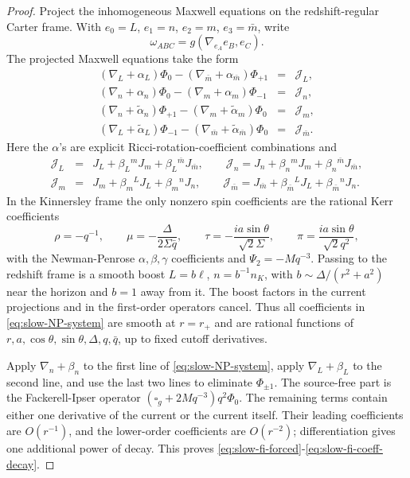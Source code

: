 \documentclass[11pt]{article}
\numberwithin{equation}{section}
\theoremstyle{plain}
\theoremstyle{definition}
\theoremstyle{remark}
\begin{document}
\begin{proof}
Project the inhomogeneous Maxwell equations on the redshift-regular Carter frame.  With \(e_0=L\), \(e_1=n\), \(e_2=m\), \(e_3=\bar m\), write
\begin{equation}
 \omega_{ABC}=g(\nabla_{e_A}e_B,e_C).
\end{equation}
The projected Maxwell equations take the form
\begin{eqnarray}\label{eq:slow-NP-system}
(\nabla_L+\alpha_L)\Phi_0-(\nabla_{\bar m}+\alpha_{\bar m})\Phi_{+1}
&=&\mathcal J_L,
\nonumber\\
(\nabla_n+\alpha_n)\Phi_0-(\nabla_m+\alpha_m)\Phi_{-1}
&=&\mathcal J_n,
\nonumber\\
(\nabla_n+\widetilde\alpha_n)\Phi_{+1}-(\nabla_m+\widetilde\alpha_m)\Phi_0
&=&\mathcal J_m,
\nonumber\\
(\nabla_L+\widetilde\alpha_L)\Phi_{-1}-(\nabla_{\bar m}+\widetilde\alpha_{\bar m})\Phi_0
&=&\mathcal J_{\bar m}.
\end{eqnarray}
Here the \(\alpha\)'s are explicit Ricci-rotation-coefficient combinations and
\begin{eqnarray}
\mathcal J_L&=&J_L+\beta_L{}^mJ_m+\beta_L{}^{\bar m}J_{\bar m},
\qquad
\mathcal J_n=J_n+\beta_n{}^mJ_m+\beta_n{}^{\bar m}J_{\bar m},
\nonumber\\
\mathcal J_m&=&J_m+\beta_m{}^LJ_L+\beta_m{}^nJ_n,
\qquad
\mathcal J_{\bar m}=J_{\bar m}+\beta_{\bar m}{}^LJ_L+\beta_{\bar m}{}^nJ_n.
\end{eqnarray}
In the Kinnersley frame the only nonzero spin coefficients are the rational Kerr coefficients
\begin{equation}
 \rho=-q^{-1},
 \qquad
 \mu=-\frac{\Delta}{2\Sigma\bar q},
 \qquad
 \tau=-\frac{ia\sin\theta}{\sqrt2\Sigma},
 \qquad
 \pi=\frac{ia\sin\theta}{\sqrt2 q^2},
\end{equation}
with the Newman-Penrose \(\alpha,\beta,\gamma\) coefficients and \(\Psi_2=-Mq^{-3}\).  Passing to the redshift frame is a smooth boost \(L=b\ell\), \(n=b^{-1}n_K\), with \(b\sim\Delta/(r^2+a^2)\) near the horizon and \(b=1\) away from it.  The boost factors in the current projections and in the first-order operators cancel.  Thus all coefficients in \eqref{eq:slow-NP-system} are smooth at \(r=r_+\) and are rational functions of \(r,a,\cos\theta,\sin\theta,\Delta,q,\bar q\), up to fixed cutoff derivatives.

Apply \(\nabla_n+\beta_n\) to the first line of \eqref{eq:slow-NP-system}, apply \(\nabla_L+\beta_L\) to the second line, and use the last two lines to eliminate \(\Phi_{\pm1}\).  The source-free part is the Fackerell-Ipser operator \((\square_g+2Mq^{-3})q^2\Phi_0\).  The remaining terms contain either one derivative of the current or the current itself.  Their leading coefficients are \(O(r^{-1})\), and the lower-order coefficients are \(O(r^{-2})\); differentiation gives one additional power of decay.  This proves \eqref{eq:slow-fi-forced}-\eqref{eq:slow-fi-coeff-decay}.
\end{proof}
\end{document}
